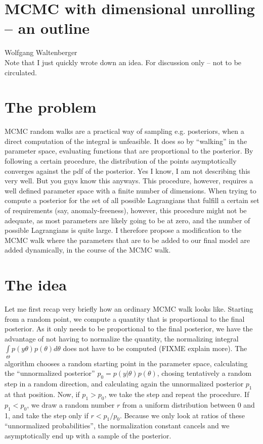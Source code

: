 \documentclass[11pt,singleside,a4paper,makeidx,notitlepage]{article}
\begin{document}
\section*{MCMC with dimensional unrolling -- an outline}
Wolfgang Waltenberger \\ 
Note that I just quickly wrote down an idea. For discussion only -- not to be circulated.
\section{The problem}
MCMC random walks are a practical way of sampling e.g. posteriors,
when a direct computation of the integral is unfeasible. 
It does so by ``walking'' in the parameter space, evaluating functions
that are proportional to the posterior. By following a certain procedure,
the distribution of the points asymptotically converges against the 
pdf of the posterior. Yes I know, I am not describing this very well. 
But you guys know this anyways.
This procedure, however, requires a well defined parameter space with 
a finite number of dimensions. When trying to compute a posterior 
for the set of all possible Lagrangians that fulfill a certain set 
of requirements (say, anomaly-freeness), however, this procedure might not 
be adequate, as most parameters are likely going to be at zero, and the 
number of possible Lagrangians is quite large. 
I therefore propose a modification to the MCMC walk where the parameters 
that are to be added to our final model are added dynamically, in the course
of the MCMC walk. 

\section{The idea}
Let me first recap very briefly how an ordinary MCMC walk looks like. 
Starting from a random point, we compute a quantity that is proportional to
the final posterior. As it only needs to be proportional to the final
posterior, we have the advantage of not having to normalize the quantity, the
normalizing integral $\int\limits_\Theta p(y\theta) p(\theta) d \theta$
does not have to be computed (FIXME explain more). 
The algorithm chooses a random starting point in the parameter space, 
calculating the ``unnormalized posterior'' $p_0 = p(y|\theta) p(\theta)$, chosing 
tentatively a random step in a random direction, and calculating again the unnormalized
posterior $p_1$ at that position. Now, if $p_1 > p_0$, we take the step and
repeat the procedure. If $p_1 < p_0$, we draw a random number $r$ from a uniform
distribution between 0 and 1, and take the step only if $r < p_1/p_0$.
Because we only look at ratios of these ``unnormalized probabilities'', the 
normalization constant cancels and we asymptotically end up with a sample
of the posterior.
\end{document}

